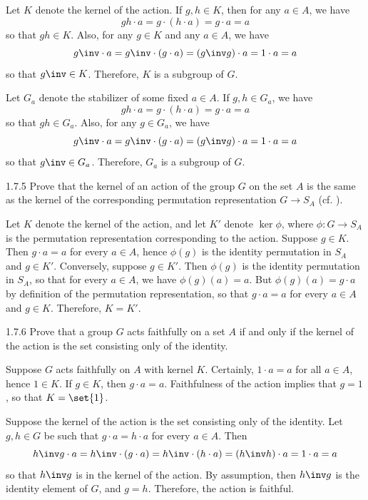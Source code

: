 \begin{solenum}[spsol]
    \item Let $K$ denote the kernel of the action.
	If $g, h \in K$, then for any $a \in A$, we have
    \[
    	gh \cdot a = g \cdot (h \cdot a) = g \cdot a = a
    \]
    so that $gh \in K$.
	Also, for any $g \in K$ and any $a \in A$, we have
    \[
    	g\inv \cdot a = g\inv \cdot (g \cdot a) = (g\inv g) \cdot a = 1 \cdot a = a
    \]
    so that $g\inv \in K$.
	Therefore, $K$ is a subgroup of $G$.
    \item Let $G_a$ denote the stabilizer of some fixed $a \in A$.
	If $g, h \in G_a$, we have
    \[
    	gh \cdot a = g \cdot (h \cdot a) = g \cdot a = a
    \]
    so that $gh \in G_a$.
	Also, for any $g \in G_a$, we have
    \[
    	g\inv \cdot a = g\inv \cdot (g \cdot a) = (g\inv g) \cdot a = 1 \cdot a = a
    \]
    so that $g\inv \in G_a$.
	Therefore, $G_a$ is a subgroup of $G$.
\end{solenum}

\begin{exercise}{1.7.5}
    Prove that the kernel of an action of the group $G$ on the set $A$ is the same as the kernel of the corresponding permutation representation $G\to S_A$ (cf. ).
\end{exercise}

\begin{sol}
    Let $K$ denote the kernel of the action, and let $K'$ denote $\ker\phi$, where $\phi : G \to S_A$ is the permutation representation corresponding to the action.
	Suppose $g \in K$.
	Then $g \cdot a = a$ for every $a \in A$, hence $\phi(g)$ is the identity permutation in $S_A$ and $g \in K'$.
	Conversely, suppose $g \in K'$.
	Then $\phi(g)$ is the identity permutation in $S_A$, so that for every $a \in A$, we have $\phi(g)(a) = a$.
	But $\phi(g)(a) = g \cdot a$ by definition of the permutation representation, so that $g \cdot a = a$ for every $a \in A$ and $g \in K$.
	Therefore, $K = K'$.
\end{sol}

\begin{exercise}{1.7.6}
    Prove that a group $G$ acts faithfully on a set $A$ if and only if the kernel of the action is the set consisting only of the identity.
\end{exercise}

\begin{soliff}
    \rightimp Suppose $G$ acts faithfully on $A$ with kernel $K$.
	Certainly, $1 \cdot a = a$ for all $a \in A$, hence $1 \in K$.
	If $g \in K$, then $g \cdot a = a$.
	Faithfulness of the action implies that $g = 1$, so that $K = \set{1}$.

    \leftimp Suppose the kernel of the action is the set consisting only of the identity.
	Let $g, h \in G$ be such that $g \cdot a = h \cdot a$ for every $a \in A$.
	Then
    \[
    	h\inv g \cdot a = h\inv \cdot (g \cdot a) = h\inv \cdot (h \cdot a) = (h\inv h) \cdot a = 1 \cdot a = a
    \]
    so that $h\inv g$ is in the kernel of the action.
	By assumption, then $h\inv g$ is the identity element of $G$, and $g = h$.
	Therefore, the action is faithful.
\end{soliff}

